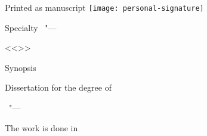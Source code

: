 \thispagestyle{empty}

\vspace{0pt plus1fill} %
\begin{flushright}
  \large{Printed as manuscript}
  \texttt{[image: personal-signature]} 
\end{flushright}

\vspace{0pt plus3fill} %
\begin{center}
\textbf {\large \thesisAuthor}
\end{center}

\vspace{0pt plus3fill} %
\begin{center}
\textbf {\Large \thesisTitle}

\vspace{0pt plus3fill} %
{\large Specialty \thesisSpecialtyNumber\ "---\par <<\thesisSpecialtyTitle>>}

\vspace{0pt plus1.5fill} %
\Large{Synopsis}\par
\large{Dissertation for the degree of\par \thesisDegree}
\end{center}

\vspace{0pt plus4fill} %
\begin{center}
{\large{\thesisCity\ "--- \thesisYear}}
\end{center}

\newpage
\thispagestyle{empty}
\noindent The work is done in \thesisInOrganization

